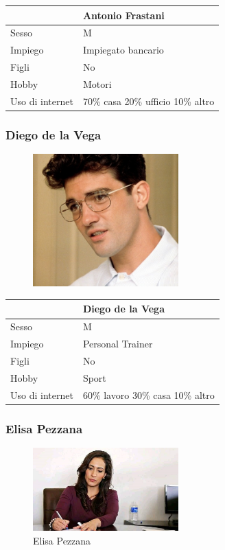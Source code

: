 \documentclass[12pt,italian,]{report}
\begin{document}
\begin{longtable}[]{@{}ll@{}}
\toprule
& Antonio Frastani\tabularnewline
\midrule
\endhead
Sesso & M\tabularnewline
Impiego & Impiegato bancario\tabularnewline
Figli & No\tabularnewline
Hobby & Motori\tabularnewline
Uso di internet & 70\% casa 20\% ufficio 10\% altro\tabularnewline
\bottomrule
\end{longtable}


\newpage
\hypertarget{diego-de-la-vega}{%
\subsubsection{Diego de la Vega}\label{diego-de-la-vega}}

\begin{figure}[h]
\centering
\includegraphics[width=0.5\textwidth,height=\textheight]{img/diego.jpg}
\end{figure}

\begin{longtable}[]{@{}ll@{}}
\toprule
& Diego de la Vega\tabularnewline
\midrule
\endhead
Sesso & M\tabularnewline
Impiego & Personal Trainer\tabularnewline
Figli & No\tabularnewline
Hobby & Sport\tabularnewline
Uso di internet & 60\% lavoro 30\% casa 10\% altro\tabularnewline
\bottomrule
\end{longtable}

\hypertarget{elisa-pezzana}{%
\subsubsection{Elisa Pezzana}\label{elisa-pezzana}}

\begin{figure}[h]
\centering
\includegraphics[width=0.5\textwidth,height=\textheight]{img/elisa.jpg}
\caption{Elisa Pezzana}
\end{figure}
\end{document}
